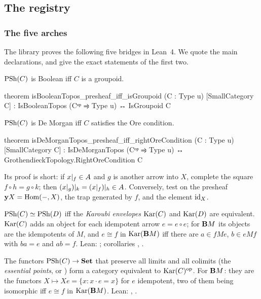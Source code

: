 \subsection{The registry}\label{sec:registry}

\subsubsection{The five arches}

The library \lp{} proves the following five bridges in Lean~4. We quote the main declarations, and give the exact statements of the first two.

\begin{bridge}[Boolean]\label{br:bool}
$\mathrm{PSh}(C)$ is Boolean iff $C$ is a groupoid.
\begin{leancode}
theorem isBooleanTopos_presheaf_iff_isGroupoid (C : Type u) [SmallCategory C] :
    IsBooleanTopos (Cᵒᵖ ⥤ Type u) ↔ IsGroupoid C
\end{leancode}
\end{bridge}

\begin{bridge}[De Morgan]\label{br:dm}
$\mathrm{PSh}(C)$ is De Morgan iff $C$ satisfies the Ore condition.
\begin{leancode}
theorem isDeMorganTopos_presheaf_iff_rightOreCondition (C : Type u)
    [SmallCategory C] :
    IsDeMorganTopos (Cᵒᵖ ⥤ Type u) ↔ GrothendieckTopology.RightOreCondition C
\end{leancode}
Its proof is short: if $x|_{f}\in A$ and $g$ is another arrow into $X$, complete the square $f\circ h = g\circ k$; then $(x|_{g})|_{k} = (x|_{f})|_{h}\in A$. Conversely, test on the presheaf $\mathbf{y} X = \operatorname{Hom}(-,X)$, the trap generated by $f$, and the element $\mathrm{id}_X$.
\end{bridge}

\begin{bridge}[Morita]\label{br:morita}
$\mathrm{PSh}(C)\simeq\mathrm{PSh}(D)$ iff the \emph{Karoubi envelopes} $\operatorname{Kar}(C)$ and $\operatorname{Kar}(D)$ are equivalent. $\operatorname{Kar}(C)$ adds an object for each idempotent arrow $e = e\circ e$; for $\mathbf{B} M$ its objects are the idempotents of $M$, and $e\cong f$ in $\operatorname{Kar}(\mathbf{B} M)$ iff there are $a\in fMe$, $b\in eMf$ with $ba = e$ and $ab = f$. Lean: ; corollaries , .
\end{bridge}

\begin{bridge}\label{br:pts}
The functors $\mathrm{PSh}(C)\to\mathbf{Set}$ that preserve all limits and all colimits (the \emph{essential points}, or ) form a category equivalent to $\operatorname{Kar}(C)^{\mathrm{op}}$. For $\mathbf{B} M$: they are the functors $X\mapsto Xe = \{x : x\cdot e = x\}$ for $e$ idempotent, two of them being isomorphic iff $e\cong f$ in $\operatorname{Kar}(\mathbf{B} M)$. Lean: , .
\end{bridge}

